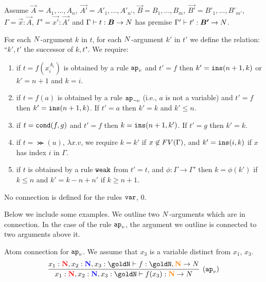 \begin{definition}
Assume $\vec{A} = A_1, \ldots, A_n$, $\vec{A'} = A'_1, \ldots, A'_{n'}$,
$\vec{B}=B_1, \ldots, B_m$, $\vec{B'}=B'_1, \ldots, B'_{m'}$,
$\Gamma = \vec{x}:\vec{A}$,
$\Gamma' = \vec{x'}:\vec{A'}$
and $\Gamma \vdash t:\vec{B} \rightarrow \N$
has premise $\Gamma' \vdash t':\vec{B'} \rightarrow \N$.


For each ${N}$-argument $k$ in $t$, for each ${N}$-argument $k'$ in $t'$ we define 
the relation: ``$k',t'$ the successor of $k,t$". We require:
\begin{enumerate}

\item
if $t=f(x_i^{A_i})$ is obtained by a rule $\apvar$ and $t'=f$ 
then $k' = {\tt ins}(n+1,k)$ or $k'=n+1$ and $k=i$.

\item
if $t=f(a)$ is obtained by a rule $\apnotvar$ (i.e., $a$ is not a variable) and $t'=f$ 
then $k' = {\tt ins}(n+1,k)$. If $t'=a$ then $k'=k$ and $k' \le n$.

\item
if $t={\tt cond}(f,g)$ and $t'=f$ then $k = {\tt ins}(n+1,k')$. 
If $t'=g$ then $k'=k$.

\item
if $t = \Succ(u)$, $\lambda x.v$, we require $k = k'$ if $x \not \in {{\relax FV}}(\Gamma)$,
and $k' = {\tt ins}(i,k)$ if $x$ has index $i$ in $\Gamma$.

\item
if $t$ is obtained by a rule ${\tt weak}$ from $t'=t$, and 
$\phi:\Gamma \rightarrow \Gamma'$ then $k = \phi(k')$ if $k \le n$
and $k' = k - n + n'$ if $k \ge n+1$.

\end{enumerate}
No connection is defined for the rules ${\tt var}$, $0$.
\end{definition}



Below we include some examples. 
We outline two ${N}$-arguments which are in connection. 
In the case of the rule $\apvar$, the argument we outline is 
connected to two arguments above it.


\begin{Eg}\label{eg:3}%
Atom connection for $\apvar$.
We assume that $x_3$ is a variable distinct from $x_1$, $x_3$.
\[
\infer[(\apvar)]{
  x_1 : \bfColor{red}{\N},{x_2} : \bfColor{blue}{\N}, x_3  : \goldN
  \prove f(x_3) : \bfColor{orange}{\N} \rightarrow \N
}{
  x_1 : \bfColor{red}{\N},{x_2} : \bfColor{blue}{\N}, x_3  : \goldN
  \prove f : \goldN, \bfColor{orange}{\N} \rightarrow \N
}
\]
\end{Eg}

